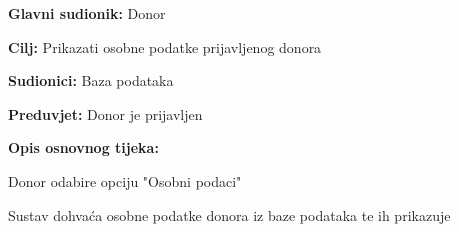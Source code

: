 					\begin{packed_item}
	
						\item \textbf{Glavni sudionik: }Donor
						\item \textbf{Cilj:} Prikazati osobne podatke prijavljenog donora
						\item \textbf{Sudionici:} Baza podataka
						\item \textbf{Preduvjet:} Donor je prijavljen
						\item \textbf{Opis osnovnog tijeka:}
						
						\item[] \begin{packed_enum}
	
							\item Donor odabire opciju "Osobni podaci"
							\item Sustav dohvaća osobne podatke donora iz baze podataka te ih prikazuje
							
						\end{packed_enum}

					\end{packed_item}
\eject 
\noindent {}
